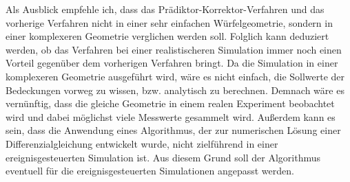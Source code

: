 \documentclass{listhesis}
\begin{document}
Als Ausblick empfehle ich, dass das Prädiktor-Korrektor-Verfahren und das vorherige Verfahren nicht in einer sehr einfachen Würfelgeometrie, sondern in einer komplexeren Geometrie verglichen werden soll. Folglich kann deduziert werden, ob das Verfahren bei einer realistischeren Simulation immer noch einen Vorteil gegenüber dem vorherigen Verfahren bringt. Da die Simulation in einer komplexeren Geometrie ausgeführt wird, wäre es nicht einfach, die Sollwerte der Bedeckungen vorweg zu wissen, bzw. analytisch zu berechnen. Demnach wäre es vernünftig, dass die gleiche Geometrie in einem realen Experiment beobachtet wird und dabei möglichst viele 	Messwerte gesammelt wird. Außerdem kann es sein, dass die Anwendung eines Algorithmus, der zur numerischen Lösung einer Differenzialgleichung entwickelt wurde, nicht zielführend in einer ereignisgesteuerten Simulation ist. Aus diesem Grund soll der Algorithmus eventuell für die ereignisgesteuerten Simulationen angepasst werden.


\cleardoublepage



\confirmation
\end{document}
